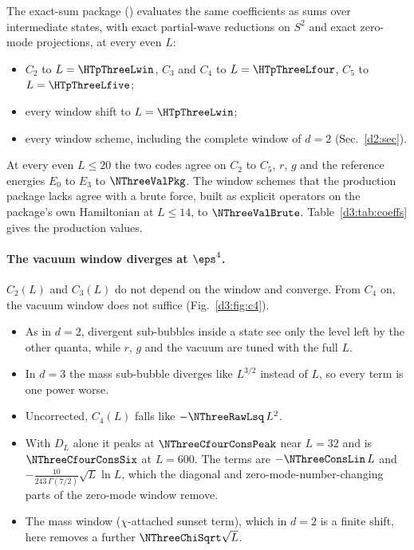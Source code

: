 The exact-sum package () evaluates the same coefficients as sums over intermediate states,
with exact partial-wave reductions on $S^2$ and exact zero-mode projections, at every even $L$:
\begin{itemize}
\item $C_2$ to $L=\HTpThreeLwin$, $C_3$ and $C_4$ to $L=\HTpThreeLfour$, $C_5$ to $L=\HTpThreeLfive$;
\item every window shift to $L=\HTpThreeLwin$;
\item every window scheme, including the complete window of $d=2$ (Sec.~\ref{d2:sec}).
\end{itemize}
At every even $L\le20$ the two codes agree on $C_2$ to $C_5$, $r$, $g$ and the reference energies $E_0$ to $E_3$ to
$\NThreeValPkg$. The window schemes that the production package lacks agree with a brute force, built as explicit
operators on the package's own Hamiltonian at $L\le14$, to $\NThreeValBrute$. Table~\ref{d3:tab:coeffs} gives the
production values.



\paragraph{The vacuum window diverges at $\eps^4$.}
$C_2(L)$ and $C_3(L)$ do not depend on the window and converge. From $C_4$ on, the vacuum window does not suffice
(Fig.~\ref{d3:fig:c4}).
\begin{itemize}
\item As in $d=2$, divergent sub-bubbles inside a state see only the level left by the other quanta, while $r$, $g$ and
 the vacuum are tuned with the full $L$.
\item In $d=3$ the mass sub-bubble diverges like $L^{3/2}$ instead of $L$, so every term is one power worse.
\item Uncorrected, $C_4(L)$ falls like $-\NThreeRawLsq\,L^2$.
\item With $D_L$ alone it peaks at $\NThreeCfourConsPeak$ near $L=32$ and is $\NThreeCfourConsSix$ at $L=600$. The
 terms are $-\NThreeConsLin\,L$ and $-\tfrac{10}{243\,\Gamma(7/2)}\sqrt L\ln L$, which the diagonal and
 zero-mode-number-changing parts of the zero-mode window remove.
\item The mass window ($\chi$-attached sunset term), which in $d=2$ is a finite shift, here removes a further
 $\NThreeChiSqrt\sqrt L$.
\end{itemize}

